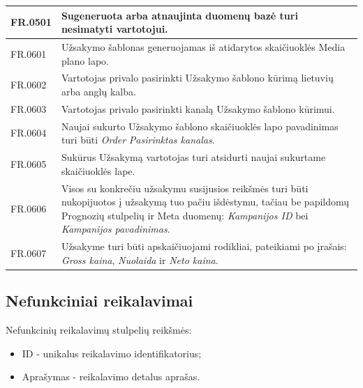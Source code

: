 {\begin{longtable}{|L{2cm}|L{13.5cm}|}
FR.0501 &
Sugeneruota arba atnaujinta duomenų bazė turi nesimatyti vartotojui.
\\ \hline    
    
FR.0601 &
Užsakymo šablonas generuojamas iš atidarytos skaičiuoklės Media plano lapo.
\\ \hline    
  
FR.0602 &
Vartotojas privalo pasirinkti Užsakymo šablono kūrimą lietuvių arba anglų kalba.
\\ \hline    
  
FR.0603 &
Vartotojas privalo pasirinkti kanalą Užsakymo šablono kūrimui.
\\ \hline    
  
FR.0604 &
Naujai sukurto Užsakymo šablono skaičiuoklės lapo pavadinimas turi būti \textit{Order} \textit{Pasirinktas kanalas}.
\\ \hline    
  
FR.0605 &
Sukūrus Užsakymą vartotojas turi atsidurti naujai sukurtame skaičiuoklės lape.
\\ \hline    
  
FR.0606 &
Visos su konkrečiu užsakymu susijusios reikšmės turi būti nukopijuotos į užsakymą tuo pačiu išdėstymu, tačiau be papildomų Prognozių stulpelių ir Meta duomenų: \textit{Kampanijos ID} bei \textit{Kampanijos pavadinimas}.
\\ \hline    
  
FR.0607 &
Užsakyme turi būti apskaičiuojami rodikliai, pateikiami po įrašais: \textit{Gross kaina}, \textit{Nuolaida} ir \textit{Neto kaina}.
\\ \hline   
  
\end{longtable}

}

\subsection{Nefunkciniai reikalavimai}

Nefunkcinių reikalavimų stulpelių reikšmės:
\begin{itemize}
    \itemsep0em 
    \item ID - unikalus reikalavimo identifikatorius;
    \item Aprašymas - reikalavimo detalus aprašas.
\end{itemize}

